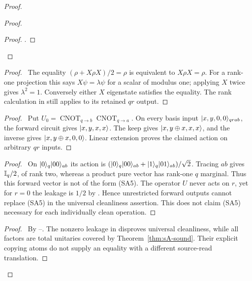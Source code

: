\begin{proof}
\begin{proof}
\begin{proof}
  .
  \end{proof}
 \end{proof}
 \begin{proof}\pf\ The equality $(\rho+X\rho X)/2=\rho$ is
 equivalent to $X\rho X=\rho$. For a rank-one projection this
 says $X\psi=\lambda\psi$ for a scalar of modulus one; applying
 $X$ twice gives $\lambda^2=1$. Conversely either $X$ eigenstate
 satisfies the equality. The rank calculation in
  still applies to its retained $qr$ output.
 \end{proof}
 \begin{proof}\pf\ Put $U_0=\operatorname{CNOT}_{q\to b}
 \operatorname{CNOT}_{q\to a}$. On every basis input
 $\lvert x,y,0,0\rangle_{qrab}$, the forward circuit gives
 $\lvert x,y,x,x\rangle$. The keep gives $\lvert x,y\oplus x,x,x\rangle$,
 and the inverse gives $\lvert x,y\oplus x,0,0\rangle$.
 Linear extension proves the claimed action on arbitrary $qr$ inputs.
 \end{proof}
 \begin{proof}\pf\ On $\lvert 0\rangle_q\lvert 00\rangle_{ab}$ its action is
 $(\lvert 0\rangle_q\lvert 00\rangle_{ab}+\lvert 1\rangle_q\lvert 01\rangle_{ab})/\sqrt2$.
 Tracing $ab$ gives $\mathbb{I}_q/2$, of rank two, whereas a product pure
 vector has rank-one $q$ marginal. Thus this forward vector is not
 of the form (SA5). The operator $U$ never acts on $r$, yet for
 $r=0$ the leakage is $1/2$ by . Hence
 unrestricted forward outputs cannot replace (SA5) in the universal
 cleanliness assertion. This does not claim (SA5) necessary for each
 individually clean operation.
 \end{proof}
 \qedstep
 \begin{proof}\pf\ By --.
 The nonzero leakage in  disproves universal
 cleanliness, while all factors are total unitaries covered by
 Theorem~\ref{thm:sA-sound}. Their explicit copying atoms do not
 supply an equality with a different source-read translation.
 \end{proof}
\end{proof}
